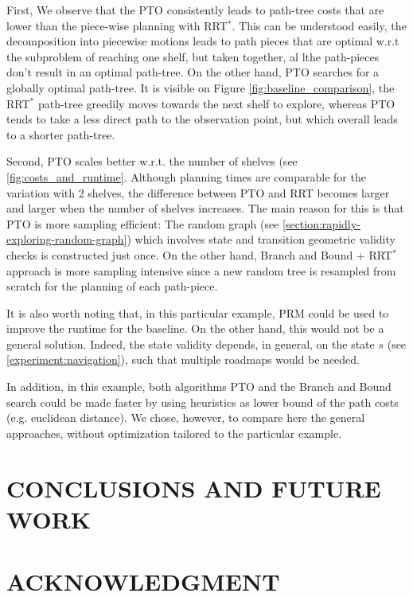 \documentclass[letterpaper, 10 pt, conference]{ieeeconf}  %
\begin{document}
First, We observe that the PTO consistently leads to path-tree costs that are lower than the piece-wise planning with RRT$^{*}$. This can be understood easily, the decomposition into piecewise motions leads to path pieces that are optimal w.r.t the subproblem of reaching one shelf, but taken together, al lthe path-pieces don't result in an optimal path-tree. On the other hand, PTO searches for a globally optimal path-tree. It is visible on Figure \ref{fig:baseline_comparison}, the RRT$^{*}$ path-tree greedily moves towards the next shelf to explore, whereas PTO tends to take a less direct path to the observation point, but which overall leads to a shorter path-tree. 

Second, PTO scales better w.r.t. the number of shelves (see \ref{fig:costs_and_runtime}. Although planning times are comparable for the variation with 2 shelves, the difference between PTO and RRT becomes larger and larger when the number of shelves increases. The main reason for this is that PTO is more sampling efficient: The random graph (see \ref{section:rapidly-exploring-random-graph}) which involves state and transition geometric validity checks is constructed just once. On the other hand, Branch and Bound + RRT$^{*}$ approach is more sampling intensive since a new random tree is resampled from scratch for the planning of each path-piece.

It is also worth noting that, in this particular example, PRM could be used to improve the runtime for the baseline. On the other hand, this would not be a general solution. Indeed, the state validity depends, in general, on the state $s$ (see \ref{experiment:navigation}), such that multiple roadmaps would be needed.

In addition, in this example, both algorithms PTO and the Branch and Bound search could be made faster by using heuristics as lower bound of the path costs (e.g. euclidean distance). We chose, however, to compare here the general approaches, without optimization tailored to the particular example.  
\section{CONCLUSIONS AND FUTURE WORK}







\section*{ACKNOWLEDGMENT}





\end{document}
